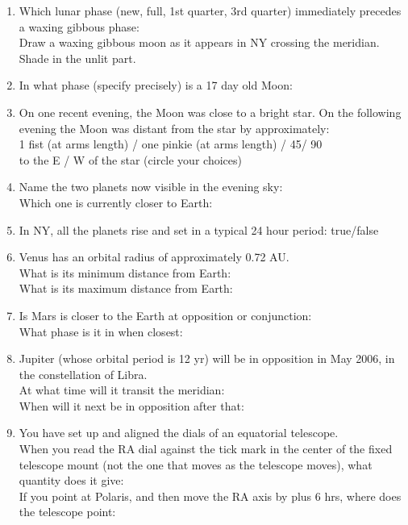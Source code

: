 \documentclass[11pt]{article}
\begin{document}
\begin{enumerate}
\vskip 1.0cm
\item 
Which lunar phase (new, full, 1st quarter, 3rd quarter) immediately
precedes a waxing gibbous phase: \\
Draw a waxing gibbous moon as it appears in NY crossing the meridian. Shade
in the unlit part.

\vskip 1.0cm

\item 
In what phase (specify precisely) is a 17 day old Moon:

\vskip 1.0cm
\item 
On one recent evening, the Moon was close to a bright star. On the following
evening the Moon was distant from the star by approximately: \\ 
1 fist (at arms length) / one pinkie (at arms length) / 45\deg / 90\deg  \\
to the E / W of the star (circle your choices)

\vskip 1.0cm
\item 
Name the two planets now visible in the evening sky: 
\\ 
Which one is currently closer to Earth:


\vskip 1.0cm
\item 
In NY, all the planets rise and set in a typical 24 hour period: true/false


\vskip 1.0cm
\item 
Venus has an orbital radius of approximately 0.72 AU. \\
What is its minimum distance from Earth: \\
What is its maximum distance from Earth:

\vskip 1.0cm
\item 
Is Mars is closer to the Earth at opposition or conjunction: \\
What phase is it in when closest:

\vskip 1.0cm
\item Jupiter (whose orbital period is 12 yr) will be in opposition in
May 2006, in the constellation of Libra. \\
At what time will it transit the meridian:\\
When will it next be in opposition after that:  


\vskip 1.0cm
\item
You have set up and aligned the dials of an equatorial telescope. \\
When you read the RA dial against the tick mark in the center of the
fixed telescope mount (not the one that moves as the telescope moves), 
what  quantity does it give: \\

If you point at Polaris, and then move the RA axis by plus 6 hrs,
where does the telescope point: \\


\end{enumerate}
\end{document}
